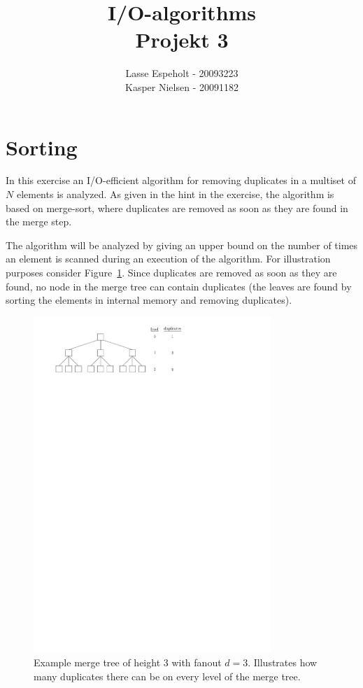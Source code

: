 \documentclass[a4paper,12pt]{article}
\begin{document}
\title{I/O-algorithms\\Projekt 3}

\author{Lasse Espeholt - 20093223\\
Kasper Nielsen - 20091182\\}

\maketitle

\pagebreak{}\tableofcontents{}\pagebreak{}

\section{Sorting}
In this exercise an I/O-efficient algorithm for removing duplicates in a multiset of $N$ elements is analyzed. As given in the hint in the exercise, the algorithm is based on merge-sort, where duplicates are removed as soon as they are found in the merge step.

The algorithm will be analyzed by giving an upper bound on the number of times an element is scanned during an execution of the algorithm. For illustration purposes consider Figure~\ref{fig:sorting:mergetree}. Since duplicates are removed as soon as they are found, no node in the merge tree can contain duplicates (the leaves are found by sorting the elements in internal memory and removing duplicates).

\begin{figure}[h!]
  \centering
  \includegraphics[width=0.8\textwidth]{images/mergetree}
  \caption{Example merge tree of height $3$ with fanout $d = 3$. Illustrates how many duplicates there can be on every level of the merge tree.}
  \label{fig:sorting:mergetree}
\end{figure}
\end{document}
